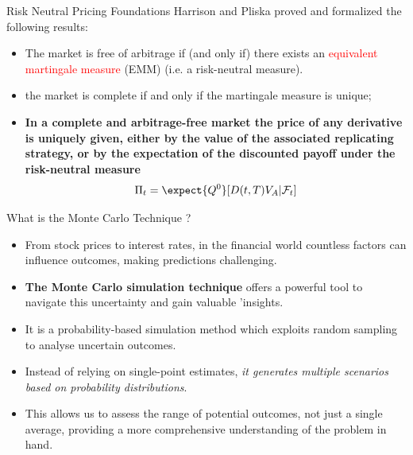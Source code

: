 \documentclass{beamer}
\begin{document}
\begin{frame}{Risk Neutral Pricing Foundations}
	Harrison and Pliska proved and formalized the following results:
	\begin{itemize}
		\item The market is free of arbitrage if (and only if) there exists an \textcolor{red}{equivalent martingale measure} (EMM) (i.e. a risk-neutral measure).
		\item the market is complete if and only if the martingale measure is unique;
		\item \textbf{In a complete and arbitrage-free market the price of any derivative is uniquely given, either by the value of the associated replicating strategy, or by the expectation of the discounted payoff under the risk-neutral measure}
		\begin{equation}
			\Pi_t = \expect{Q^0}[D(t,T)V_A|\mathcal{F}_t]
			\label{eq:risk_neutral_pricing}
		\end{equation}
	\end{itemize}
\end{frame}

\begin{frame}{What is the Monte Carlo Technique ?}
\begin{itemize}
	\item From stock prices to interest rates, in the financial world countless factors can influence outcomes, making predictions challenging. 
	\item \textbf{The Monte Carlo simulation technique} offers a powerful tool to navigate this uncertainty and gain valuable 'insights.
	\item It is a probability-based simulation method which exploits random sampling to analyse uncertain outcomes.
	\item Instead of relying on single-point estimates, \emph{it generates multiple scenarios based on probability distributions}. 
	\item This allows us to assess the range of potential outcomes, not just a single average, providing a more comprehensive understanding of the problem in hand.
\end{itemize}
\end{frame}
\end{document}

